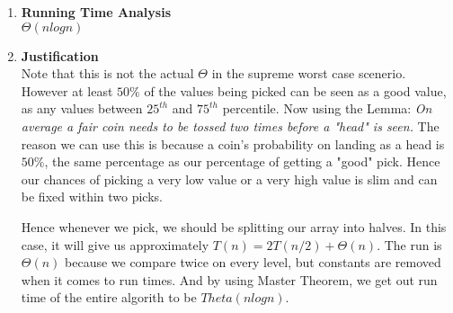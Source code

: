 \documentclass[11pt]{article}
\newenvironment{qparts}{\begin{enumerate}[{(}a{)}]}{\end{enumerate}}
\begin{document}
\begin{qparts}
\begin{qparts}
		Since $S_1$ is already paired with $G_1$, all other Goldilocks must find $S_1$ either too hot or too cold. And so, after comparing the rest of the Goldilocks to $S_1$, we will have split the rest of the Goldilocks into two new groups. And because the soups are relative to each other, if $G_1$ finds a soup (call this $S_x$) too hot, a Goldilock who finds $S_1$ too hot will definitely find $S_x$ too hot, and vice versa. 
		
		\begin{qparts}
			\item[] \textbf{Case 2.1:} \\
			If a Goldilocks who is not $G_1$ finds $S_1$ too hot, she will surely find all soups that $G_1$ finds too hot, too hot. In this case, this Goldilock should be put in the same comparison list as the soups that are too cold for $G_1$. Now we cut our search amount some. 
			\item[] \textbf{Case 2.2:} \\
			If a Goldilocks who is not $G_1$ finds $S_1$ too cold, she will surely find all soups that $G_1$ finds too cold, too cold. In this case, this Goldilock should be put in the same comparison list as the soups that are too hot for $G_1$. Now we cut our search amount some. 
		\end{qparts}
		
		Now we repeat the process on the too cold and too hot list. Eventually we should hit our base case, as we constantly pick one and find its match, then split the list into twos. 
		 
	\end{qparts}


	\item[] \textbf{Running Time Analysis} \\
	$\Theta(nlogn)$
	
	\item[] \textbf{Justification} \\
	Note that this is not the actual $\Theta$ in the supreme worst case scenerio. However at least $50\%$ of the values being picked can be seen as a good value, as any values between $25^{th}$ and $75^{th}$ percentile. Now using the Lemma: \textit{On average a fair coin needs to be tossed two times before a "head" is seen.} The reason we can use this is because a coin's probability on landing as a head is $50\%$, the same percentage as our percentage of getting a "good" pick. Hence our chances of picking a very low value or a very high value is slim and can be fixed within two picks. 
	
	Hence whenever we pick, we should be splitting our array into halves. In this case, it will give us approximately $T(n) = 2T(n/2) + \Theta(n)$. The run is $\Theta(n)$ because we compare twice on every level, but constants are removed when it comes to run times. And by using Master Theorem, we get out run time of the entire algorith to be $Theta(nlogn)$.
\end{qparts}
\end{document}
